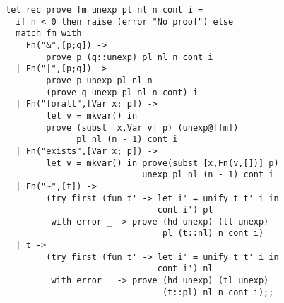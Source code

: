 \begin{slide*}


\begin{black}\begin{footnotesize}\begin{verbatim}
let rec prove fm unexp pl nl n cont i =
  if n < 0 then raise (error "No proof") else
  match fm with
    Fn("&",[p;q]) ->
        prove p (q::unexp) pl nl n cont i
  | Fn("|",[p;q]) ->
        prove p unexp pl nl n
        (prove q unexp pl nl n cont) i
  | Fn("forall",[Var x; p]) ->
        let v = mkvar() in
        prove (subst [x,Var v] p) (unexp@[fm])
              pl nl (n - 1) cont i
  | Fn("exists",[Var x; p]) ->
        let v = mkvar() in prove(subst [x,Fn(v,[])] p)
                           unexp pl nl (n - 1) cont i
  | Fn("~",[t]) ->
        (try first (fun t' -> let i' = unify t t' i in
                              cont i') pl
         with error _ -> prove (hd unexp) (tl unexp)
                               pl (t::nl) n cont i)
  | t ->
        (try first (fun t' -> let i' = unify t t' i in
                              cont i') nl
         with error _ -> prove (hd unexp) (tl unexp)
                               (t::pl) nl n cont i);;
\end{verbatim}\end{footnotesize}\end{black}

\end{slide*}




